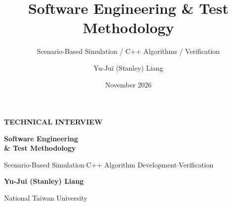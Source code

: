 \documentclass[aspectratio=169,10pt]{beamer}
\title{Software Engineering \& Test Methodology}
\subtitle{Scenario-Based Simulation / C++ Algorithms / Verification}
\author{Yu-Jui (Stanley) Liang}
\institute{National Taiwan University}
\date{November 2026}
\begin{document}
{
\begin{frame}[plain]
  \vspace*{.88cm}
  {\normalsize\bfseries\color{Accent}TECHNICAL INTERVIEW}\par
  \vspace{.44cm}
  {\fontsize{23}{27}\selectfont\bfseries\color{Ink}Software Engineering\\[2mm]\& Test Methodology}\par
  \vspace{.28cm}
  {\color{Muted}\fontsize{11}{14}\selectfont
     Scenario-Based Simulation\quad $\cdot$\quad C++ Algorithm Development\quad $\cdot$\quad Verification}\par
  \vspace{.70cm}
  {\fontsize{17}{21}\selectfont\bfseries Yu-Jui (Stanley) Liang}\par
  \vspace{.08cm}
  {\fontsize{14}{18}\selectfont\color{Muted}National Taiwan University}\par
  \vfill
\end{frame}}
\end{document}

